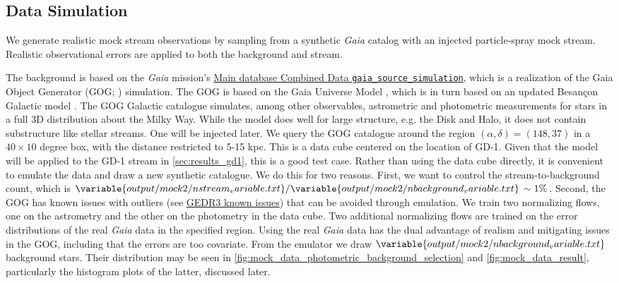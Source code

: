 \documentclass[twocolumn, linenumbers]{aastex631}
\newcommand{\stream}[1]{#1}
\newcommand{\dataarchive}[1]{\textit{#1}}
\newcommand{\Gaia}{\dataarchive{Gaia}}
\begin{document}
    \subsection{Data Simulation} \label{sub:results_mock:data}

        We generate realistic mock stream observations by sampling from a synthetic \Gaia{} catalog with an injected particle-spray mock stream. Realistic observational errors are applied to both the background and stream.

        The background is based on the \Gaia{} mission's \href{https://gea.esac.esa.int/archive/documentation/GEDR3/Gaia_archive/chap_datamodel/sec_dm_simulation_tables/ssec_dm_gaia_source_simulation.html}{Main database Combined Data \texttt{gaia\_source\_simulation}}, which is a realization of the Gaia Object Generator (GOG; \citealt{2014EAS....67..355A}) simulation. The GOG is based on the Gaia Universe Model \citep{2012A&A...543A.100R}, which is in turn based on an updated Besan{\c c}on Galactic model \citep{2003A&A...409..523R}. The GOG Galactic catalogue simulates, among other observables, astrometric and photometric measurements for stars in a full 3D distribution about the Milky Way. While the model does well for large structure, e.g. the Disk and Halo, it does not contain substructure like stellar streams. One will be injected later.
        We query the GOG catalogue around the region $(\alpha, 
        \delta) = (148, 37)$ in a $40\times 10$ degree box, 
        with the distance restricted to 5-15 kpc.
        This is a data cube centered on the location of \stream{GD-1}. Given that the model will be applied to the \stream{GD-1} stream in \autoref{sec:results_gd1}, this is a good test case.
        Rather than using the data cube directly, it is convenient to emulate the data and draw a new synthetic catalogue. We do this for two reasons. First, we want to control the stream-to-background count, which is $\variable{output/mock2/nstream_variable.txt} / \variable{output/mock2/nbackground_variable.txt} \, \sim 1\%$. 
        Second, the GOG has known issues with outliers (see \href{https://gea.esac.esa.int/archive/documentation/GEDR3/Data_processing/chap_simulated/ssec_cu2knowniss/}{GEDR3 known issues}) that can be avoided through emulation. We train two normalizing flows, one on the astrometry and the other on the photometry in the data cube. Two additional normalizing flows are trained on the error distributions of the real \Gaia{} data in the specified region. Using the real \Gaia{} data has the dual advantage of realism and mitigating issues in the GOG, including that the errors are too covariate. From the emulator we draw $\variable{output/mock2/nbackground_variable.txt}$ background stars. Their distribution may be seen in \autoref{fig:mock_data_photometric_background_selection} and \autoref{fig:mock_data_result}, particularly the histogram plots of the latter, discussed later.
\end{document}
